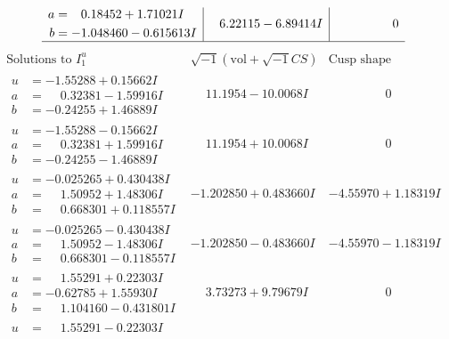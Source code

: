 \documentclass[1p]{elsarticle_modified}
\theoremstyle{definition}
\newcommand{\I}{\sqrt{-1}}
\begin{document}
$$\begin{array}{c|c|c}
\begin{aligned}
a &= \phantom{-}0.18452 + 1.71021 I \\
b &= -1.048460 - 0.615613 I\end{aligned}
 & \phantom{-}6.22115 - 6.89414 I & \phantom{-0.000000 } 0\\
 \hline 
 \end{array}$$\newpage$$\begin{array}{c|c|c}  
\text{Solutions to }I^u_{1}& \I (\text{vol} + \sqrt{-1}CS) & \text{Cusp shape}\\
 \hline 
\begin{aligned}
u &= -1.55288 + 0.15662 I \\
a &= \phantom{-}0.32381 - 1.59916 I \\
b &= -0.24255 + 1.46889 I\end{aligned}
 & \phantom{-}11.1954 - 10.0068 I & \phantom{-0.000000 } 0 \\ \hline\begin{aligned}
u &= -1.55288 - 0.15662 I \\
a &= \phantom{-}0.32381 + 1.59916 I \\
b &= -0.24255 - 1.46889 I\end{aligned}
 & \phantom{-}11.1954 + 10.0068 I & \phantom{-0.000000 } 0 \\ \hline\begin{aligned}
u &= -0.025265 + 0.430438 I \\
a &= \phantom{-}1.50952 + 1.48306 I \\
b &= \phantom{-}0.668301 + 0.118557 I\end{aligned}
 & -1.202850 + 0.483660 I & -4.55970 + 1.18319 I \\ \hline\begin{aligned}
u &= -0.025265 - 0.430438 I \\
a &= \phantom{-}1.50952 - 1.48306 I \\
b &= \phantom{-}0.668301 - 0.118557 I\end{aligned}
 & -1.202850 - 0.483660 I & -4.55970 - 1.18319 I \\ \hline\begin{aligned}
u &= \phantom{-}1.55291 + 0.22303 I \\
a &= -0.62785 + 1.55930 I \\
b &= \phantom{-}1.104160 - 0.431801 I\end{aligned}
 & \phantom{-}3.73273 + 9.79679 I & \phantom{-0.000000 } 0 \\ \hline\begin{aligned}
u &= \phantom{-}1.55291 - 0.22303 I \\

\end{aligned}
\end{array}$$
\end{document}
